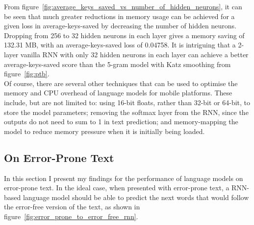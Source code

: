 \documentclass[a4paper, 12pt]{report}
\begin{document}
From figure~\ref{fig:average_keys_saved_vs_number_of_hidden_neurons}, it can be seen that much greater reductions in memory usage can be achieved for a given loss in average-keys-saved by decreasing the number of hidden neurons. Dropping from 256 to 32 hidden neurons in each layer gives a memory saving of 132.31 MB, with an average-keys-saved loss of 0.04758. It is intriguing that a 2-layer vanilla RNN with only 32 hidden neurons in each layer can achieve a better average-keys-saved score than the 5-gram model with Katz smoothing from figure~\ref{fig:ptb}. \\

Of course, there are several other techniques that can be used to optimise the memory and CPU overhead of language models for mobile platforms. These include, but are not limited to: using 16-bit floats, rather than 32-bit or 64-bit, to store the model parameters; removing the softmax layer from the RNN, since the outputs do not need to sum to 1 in text prediction; and memory-mapping the model to reduce memory pressure when it is initially being loaded.

\subsection{On Error-Prone Text} \label{error_prone_evaluation}

In this section I present my findings for the performance of language models on error-prone text. In the ideal case, when presented with error-prone text, a RNN-based language model should be able to predict the next words that would follow the error-free version of the text, as shown in figure~\ref{fig:error_prone_to_error_free_rnn}. \\
\end{document}
